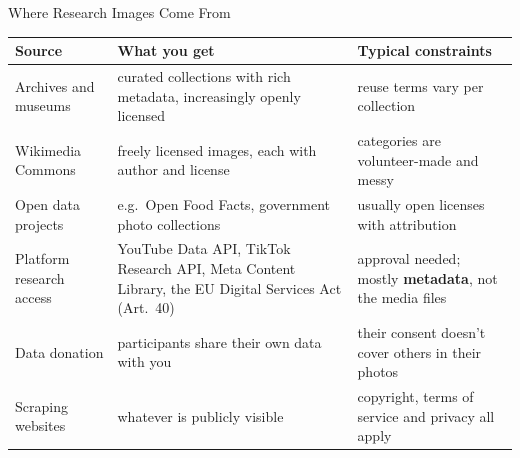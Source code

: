 \begin{frame}{Where Research Images Come From}
\vspace{0.1cm}
{\footnotesize
\begin{tabular}{@{}>{\raggedright\arraybackslash}p{2.9cm}>{\raggedright\arraybackslash}p{5.4cm}>{\raggedright\arraybackslash}p{5.0cm}@{}}
\toprule
\textbf{Source} & \textbf{What you get} & \textbf{Typical constraints} \\
\midrule
Archives and museums & curated collections with rich metadata, increasingly openly licensed & reuse terms vary per collection \\[2pt]
Wikimedia Commons & freely licensed images, each with author and license & categories are volunteer-made and messy \\[2pt]
Open data projects & e.g.\ Open Food Facts, government photo collections & usually open licenses with attribution \\[2pt]
Platform research access & YouTube Data API, TikTok Research API, Meta Content Library, the EU Digital Services Act (Art.~40) & approval needed; mostly \textbf{metadata}, not the media files \\[2pt]
Data donation & participants share their own data with you & their consent doesn't cover others in their photos \\[2pt]
Scraping websites & whatever is publicly visible & copyright, terms of service and privacy all apply \\
\bottomrule
\end{tabular}}

\vspace{0.15cm}
\end{frame}

